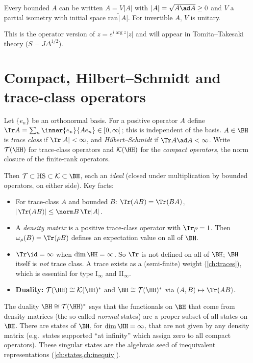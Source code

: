 \begin{theorem}
Every bounded $A$ can be written $A=V|A|$ with $|A|=\sqrt{A\ad A}\ge0$ and $V$ a partial isometry with initial space $\overline{\mathrm{ran}\,|A|}$. For invertible $A$, $V$ is unitary.
\end{theorem}
This is the operator version of $z=e^{i\arg z}|z|$ and will appear in Tomita--Takesaki theory ($S=J\Delta^{1/2}$).

\section{Compact, Hilbert--Schmidt and trace-class operators}

\begin{definition}
Let $\{e_n\}$ be an orthonormal basis. For a positive operator $A$ define $\Tr A=\sum_n\inner{e_n}{Ae_n}\in[0,\infty]$; this is independent of the basis. $A\in\BH$ is \emph{trace class} if $\Tr|A|<\infty$, and \emph{Hilbert--Schmidt} if $\Tr A\ad A<\infty$. Write $\mathcal T(\HH)$ for trace-class operators and $\mathcal K(\HH)$ for the \emph{compact operators}, the norm closure of the finite-rank operators.
\end{definition}

Then $\mathcal T\subset\mathrm{HS}\subset\mathcal K\subset\BH$, each an \emph{ideal} (closed under multiplication by bounded operators, on either side). Key facts:
\begin{itemize}
\item For trace-class $A$ and bounded $B$: $\Tr(AB)=\Tr(BA)$, $|\Tr(AB)|\le\norm B\,\Tr|A|$.
\item A \emph{density matrix} is a positive trace-class operator with $\Tr\rho=1$. Then $\omega_\rho(B)=\Tr(\rho B)$ defines an expectation value on all of $\BH$.
\item $\Tr\id=\infty$ when $\dim\HH=\infty$. So $\Tr$ is not defined on all of $\BH$; $\BH$ itself is \emph{not} trace class. A trace exists as a (semi-finite) weight (\cref{ch:traces}), which is essential for type I$_\infty$ and II$_\infty$.
\item \textbf{Duality:} $\mathcal T(\HH)\cong\mathcal K(\HH)^*$ and $\BH\cong\mathcal T(\HH)^*$ via $(A,B)\mapsto\Tr(AB)$.
\end{itemize}

\begin{whatwrong}
The duality $\BH\cong\mathcal T(\HH)^*$ says that the functionals on $\BH$ that come from density matrices (the so-called \emph{normal} states) are a proper subset of all states on $\BH$. There are states of $\BH$, for $\dim\HH=\infty$, that are not given by any density matrix (e.g.\ states supported ``at infinity'' which assign zero to all compact operators). These singular states are the algebraic seed of inequivalent representations (\cref{ch:states,ch:inequiv}).
\end{whatwrong}

